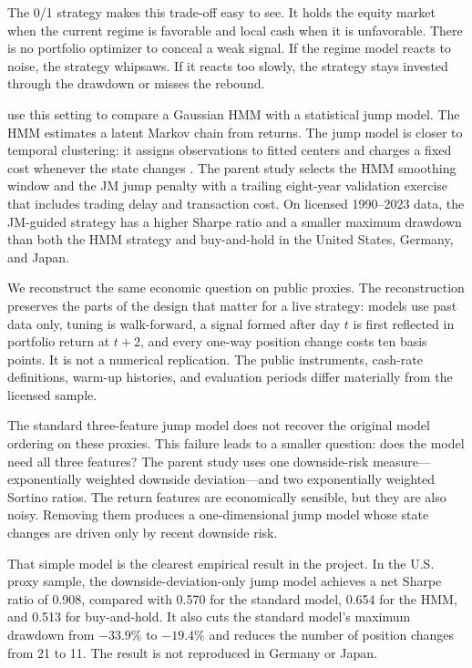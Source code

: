 \documentclass[11pt]{article}
\begin{document}
The 0/1 strategy makes this trade-off easy to see. It holds the equity market
when the current regime is favorable and local cash when it is unfavorable.
There is no portfolio optimizer to conceal a weak signal. If the regime model
reacts to noise, the strategy whipsaws. If it reacts too slowly, the strategy
stays invested through the drawdown or misses the rebound.

\citet{shu2024} use this setting to compare a Gaussian HMM with a statistical
jump model. The HMM estimates a latent Markov chain from returns. The jump model
is closer to temporal clustering: it assigns observations to fitted centers and
charges a fixed cost whenever the state changes \citep{bemporad2018,nystrup2020}.
The parent study selects the HMM smoothing window and the JM jump penalty with a
trailing eight-year validation exercise that includes trading delay and
transaction cost. On licensed 1990--2023 data, the JM-guided strategy has a
higher Sharpe ratio and a smaller maximum drawdown than both the HMM strategy
and buy-and-hold in the United States, Germany, and Japan.

We reconstruct the same economic question on public proxies. The reconstruction
preserves the parts of the design that matter for a live strategy: models use
past data only, tuning is walk-forward, a signal formed after day $t$ is first
reflected in portfolio return at $t+2$, and every one-way position change costs
ten basis points. It is not a numerical replication. The public instruments,
cash-rate definitions, warm-up histories, and evaluation periods differ
materially from the licensed sample.

The standard three-feature jump model does not recover the original model
ordering on these proxies. This failure leads to a smaller question: does the
model need all three features? The parent study uses one downside-risk
measure---exponentially weighted downside deviation---and two exponentially
weighted Sortino ratios. The return features are economically sensible, but they
are also noisy. Removing them produces a one-dimensional jump model whose state
changes are driven only by recent downside risk.

That simple model is the clearest empirical result in the project. In the U.S.
proxy sample, the downside-deviation-only jump model achieves a net Sharpe ratio
of 0.908, compared with 0.570 for the standard model, 0.654 for the HMM, and
0.513 for buy-and-hold. It also cuts the standard model's maximum drawdown from
$-33.9\%$ to $-19.4\%$ and reduces the number of position changes from 21 to 11.
The result is not reproduced in Germany or Japan.
\end{document}
